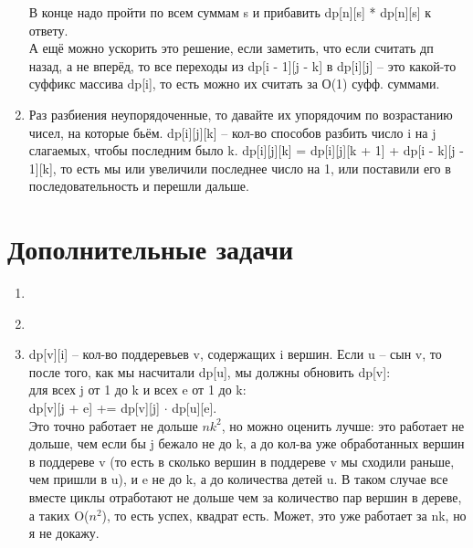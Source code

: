 \documentclass[12pt]{article}
\begin{document}
\begin{enumerate}
	В конце надо пройти по всем суммам s и прибавить dp[n][s] * dp[n][s] к ответу. \\
	А ещё можно ускорить это решение, если заметить, что если считать дп назад, а не вперёд, то все переходы из 
	dp[i - 1][j - k] в dp[i][j] -- это какой-то суффикс массива dp[i], то есть можно их считать за О(1) суфф. суммами. \\
	\item Раз разбиения неупорядоченные, то давайте их упорядочим по возрастанию чисел, на которые бьём. 
	dp[i][j][k] -- кол-во способов разбить число i на j слагаемых, чтобы последним было k. 
	dp[i][j][k] = dp[i][j][k + 1] + dp[i - k][j - 1][k], то есть мы или увеличили последнее число на 1, или поставили его 
	в последовательность и перешли дальше. \\
\end{enumerate}

\section{Дополнительные задачи}

\begin{enumerate}
	\setlength{\parskip}{0pt} 
	\setlength{\itemsep}{0pt} 
	\item ~\\
	\item ~\\
	\item dp[v][i] -- кол-во поддеревьев v, содержащих i вершин. Если u -- сын v, то после того, как мы насчитали dp[u], 
	мы должны обновить dp[v]: \\
	для всех j от 1 до k и всех e от 1 до k: \\
	dp[v][j + e] += dp[v][j] $\cdot$ dp[u][e]. \\
	Это точно работает не дольше $nk^2$, но можно оценить лучше: это работает не дольше, чем если бы j бежало не до k, а до 
	кол-ва уже обработанных вершин в поддереве v (то есть в сколько вершин в поддереве v мы сходили раньше, чем пришли в u), 
	и e не до k, а до количества детей u. В таком случае все вместе циклы отработают не дольше чем за количество пар 
	вершин в дереве, а таких O($n^2$), то есть успех, квадрат есть. Может, это уже работает за nk, но я не докажу. \\
\end{enumerate}
\end{document}
